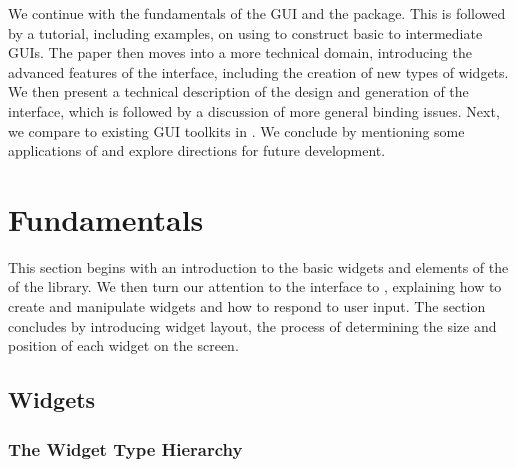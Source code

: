 \documentclass[article]{jss}
\begin{document}
We continue with the fundamentals of the  GUI and the
package. This is followed by a tutorial, including examples, on using 
 to construct basic to intermediate GUIs. The paper then
moves into 
a more technical domain, introducing the advanced features of the
interface, 
including the creation of new types of widgets. We then present a
technical 
description of the design and generation of
the interface, which is followed by a discussion of more general
binding issues.
Next, we compare  to existing GUI toolkits in .
We conclude
by mentioning some applications of  and explore directions
for future development.

\section{Fundamentals}

This section begins with an introduction to the basic widgets and
elements of the of the  library.
We then turn our attention to the  interface to 
, explaining how to create and manipulate widgets and how to
respond to
user input. The section concludes by introducing widget layout, the
process
of determining the size and position of each widget on the screen.


\subsection[GTK+ Widgets]{ Widgets}

\subsubsection{The Widget Type Hierarchy}
\end{document}
